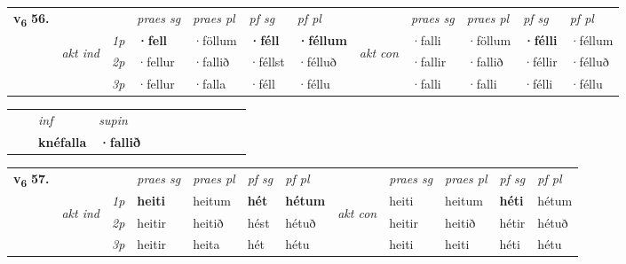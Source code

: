 \begin{tabular}{llllllllllll} \toprule
\multirow{4}{*}{{{\textbf{v{\textsubscript{6}}} \Large{\textbf{56.}}}}}  & &   &  \textit{praes sg}  & \textit{praes pl}  &\textit{ pf sg} & \textit{pf pl} &  &  \textit{praes sg}  & \textit{praes pl}  & \textit{pf sg} & \textit{pf pl } \\*
	\cmidrule{4-7} \cmidrule{9-12}
 & \multirow{3}{*}{\begin{turn}{90}\textit{akt ind}\end{turn}} & {\textit{1p}} & \textbf{·fell} & ·föllum    & \textbf{·féll} & \textbf{·féllum} & \multirow{3}{*}{\begin{turn}{90}\textit{akt con}\end{turn}} &·falli & ·föllum & \textbf{·félli} & ·féllum\\*
& &  {\textit{2p}} &  ·fellur  & ·fallið   & ·féllst & ·félluð & & ·fallir & ·fallið & ·féllir & ·félluð \\*
& &  {\textit{3p}} & ·fellur & ·falla   & ·féll & ·féllu & & ·falli & ·falli& ·félli & ·féllu  \\*
\cmidrule{4-7} \cmidrule{9-12}
\end{tabular}


\begin{tabular}{llllllllllll}
 & & \textit{inf}      & \textit{supin}       \\*
  & & \textbf{knéfalla}       &  \textbf{·fallið}   \\*
\cmidrule{1-12}
\end{tabular}



\begin{tabular}{llllllllllll} \toprule
\multirow{4}{*}{{{\textbf{v{\textsubscript{6}}} \Large{\textbf{57.}}}}}  & &   &  \textit{praes sg}  & \textit{praes pl}  &\textit{ pf sg} & \textit{pf pl} &  &  \textit{praes sg}  & \textit{praes pl}  & \textit{pf sg} & \textit{pf pl } \\*
	\cmidrule{4-7} \cmidrule{9-12}
 & \multirow{3}{*}{\begin{turn}{90}\textit{akt ind}\end{turn}} & {\textit{1p}} & \textbf{heiti} & heitum    & \textbf{hét} & \textbf{hétum} & \multirow{3}{*}{\begin{turn}{90}\textit{akt con}\end{turn}} &heiti & heitum & \textbf{héti} & hétum\\*
& &  {\textit{2p}} &  heitir  & heitið   & hést & hétuð & & heitir & heitið & hétir & hétuð \\*
& &  {\textit{3p}} & heitir & heita   & hét & hétu & & heiti & heiti& héti & hétu  \\*
\cmidrule{4-7} \cmidrule{9-12}
\end{tabular}


